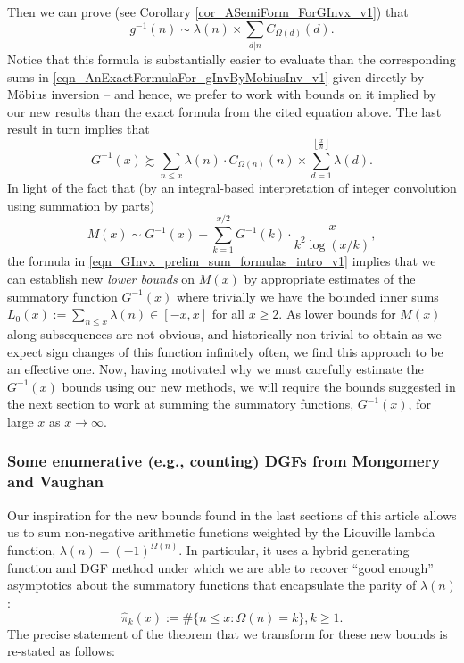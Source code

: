 \documentclass[11pt,reqno,a4letter]{article}
\numberwithin{figure}{section}
\numberwithin{table}{section}
\newcommand{\Floor}[2]{\ensuremath{\left\lfloor \frac{#1}{#2} \right\rfloor}}
\theoremstyle{plain}
\numberwithin{theorem}{section}
\theoremstyle{definition}
\begin{document}
Then we can prove (see Corollary \ref{cor_ASemiForm_ForGInvx_v1}) that 
\[
g^{-1}(n) \sim \lambda(n) \times \sum_{d|n} C_{\Omega(d)}(d). 
\]
Notice that this formula is substantially easier to evaluate than the corresponding sums in 
\eqref{eqn_AnExactFormulaFor_gInvByMobiusInv_v1} given directly by M\"obius inversion -- and hence, 
we prefer to work with bounds on it implied by our new results than the exact formula from the 
cited equation above. 
The last result in turn implies that 
\begin{equation} 
\label{eqn_GInvx_prelim_sum_formulas_intro_v1} 
G^{-1}(x) \succsim \sum_{n \leq x} \lambda(n) \cdot C_{\Omega(n)}(n) \times 
     \sum_{d=1}^{\Floor{x}{n}} \lambda(d). 
\end{equation} 
In light of the fact that 
(by an integral-based interpretation of integer convolution using summation by parts) 
\[
M(x) \sim G^{-1}(x) - \sum_{k=1}^{x/2} G^{-1}(k) \cdot \frac{x}{k^2 \log(x/k)}, 
\]
the formula in \eqref{eqn_GInvx_prelim_sum_formulas_intro_v1} implies that we can establish 
new \emph{lower bounds} on $M(x)$ by appropriate estimates of the summatory function 
$G^{-1}(x)$ where trivially we have the bounded inner sums 
$L_0(x) := \sum_{n \leq x} \lambda(n) \in [-x, x]$ for all $x \geq 2$. 
As lower bounds for $M(x)$ along subsequences are not obvious, and historically non-trivial to obtain as 
we expect sign changes of this function infinitely often, we find this approach to be an effective one. 
Now, having motivated why we must carefully estimate the $G^{-1}(x)$ bounds using our new 
methods, we will require the bounds suggested in the next section to work at summing the 
summatory functions, $G^{-1}(x)$, for large $x$ as $x \rightarrow \infty$. 

\subsubsection{Some enumerative (e.g., counting) DGFs from Mongomery and Vaughan} 

Our inspiration for the new bounds found in the last sections of this article allows us to sum 
non-negative arithmetic functions weighted by the Liouville lambda function, 
$\lambda(n) = (-1)^{\Omega(n)}$. In particular, it uses a hybrid generating function and DGF method 
under which we are able to recover ``good enough'' asymptotics about the summatory functions that 
encapsulate the parity of $\lambda(n)$: 
\[
\widehat{\pi}_k(x) := \#\{n \leq x: \Omega(n) = k\}, k \geq 1. 
\] 
The precise statement of the theorem that we transform for these new bounds is re-stated as follows: 
\end{document}
